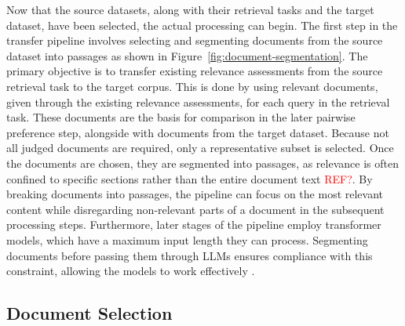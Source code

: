 Now that the source datasets, along with their retrieval tasks and the target dataset, have been selected, the actual processing can begin. The first step in the transfer pipeline involves selecting and segmenting documents from the source dataset into passages as shown in Figure~\ref{fig:document-segmentation}. The primary objective is to transfer existing relevance assessments from the source retrieval task to the target corpus. This is done by using relevant documents, given through the existing relevance assessments, for each query in the retrieval task. These documents are the basis for comparison in the later pairwise preference step, alongside with documents from the target dataset. Because not all judged documents are required, only a representative subset is selected. Once the documents are chosen, they are segmented into passages, as relevance is often confined to specific sections rather than the entire document text \textcolor{red}{REF?}. By breaking documents into passages, the pipeline can focus on the most relevant content while disregarding non-relevant parts of a document in the subsequent processing steps. Furthermore, later stages of the pipeline employ transformer models, which have a maximum input length they can process. Segmenting documents before passing them through LLMs ensures compliance with this constraint, allowing the models to work effectively \citep{levy:2024}.

\subsection{Document Selection}\label{document-selection}

